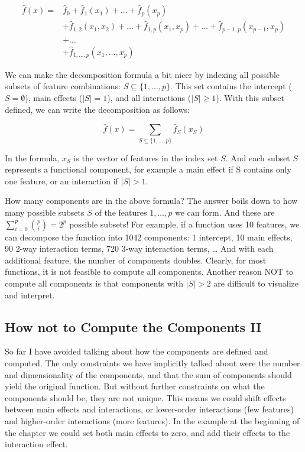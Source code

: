 \documentclass[
  11pt,
]{scrbook}
\begin{document}
\begin{align*}
\hat{f}(x) = & \hat{f}_0 + \hat{f}_1(x_1) + \ldots + \hat{f}_p(x_p) \\
& + \hat{f}_{1,2}(x_1, x_2) + \ldots + \hat{f}_{1,p}(x_1, x_p) + \ldots + \hat{f}_{p-1,p}(x_{p-1}, x_p) \\ 
& + \ldots  \\ & +  \hat{f}_{1,\ldots,p}(x_1, \ldots, x_p)
\end{align*}

We can make the decomposition formula a bit nicer by indexing all possible subsets of feature combinations: \(S\subseteq\{1,\ldots,p\}\).
This set contains the intercept (\(S=\emptyset\)), main effects (\(|S|=1\)), and all interactions (\(|S|\geq{}1\)).
With this subset defined, we can write the decomposition as follows:

\[\hat{f}(x) = \sum_{S\subseteq\{1,\ldots,p\}} \hat{f}_S(x_S)\]

In the formula, \(x_S\) is the vector of features in the index set \(S\).
And each subset \(S\) represents a functional component, for example a main effect if S contains only one feature, or an interaction if \(|S| > 1\).

How many components are in the above formula?
The answer boils down to how many possible subsets \(S\) of the features \(1,\ldots, p\) we can form.
And these are \(\sum_{i=0}^p\binom{p}{i}=2^p\) possible subsets!
For example, if a function uses 10 features, we can decompose the function into 1042 components: 1 intercept, 10 main effects, 90 2-way interaction terms, 720 3-way interaction terms, \ldots{}
And with each additional feature, the number of components doubles.
Clearly, for most functions, it is not feasible to compute all components.
Another reason NOT to compute all components is that components with \(|S|>2\) are difficult to visualize and interpret.

\hypertarget{how-not-to-compute-the-components-ii}{%
\subsection{How not to Compute the Components II}\label{how-not-to-compute-the-components-ii}}

So far I have avoided talking about how the components are defined and computed.
The only constraints we have implicitly talked about were the number and dimensionality of the components, and that the sum of components should yield the original function.
But without further constraints on what the components should be, they are not unique.
This means we could shift effects between main effects and interactions, or lower-order interactions (few features) and higher-order interactions (more features).
In the example at the beginning of the chapter we could set both main effects to zero, and add their effects to the interaction effect.
\end{document}
